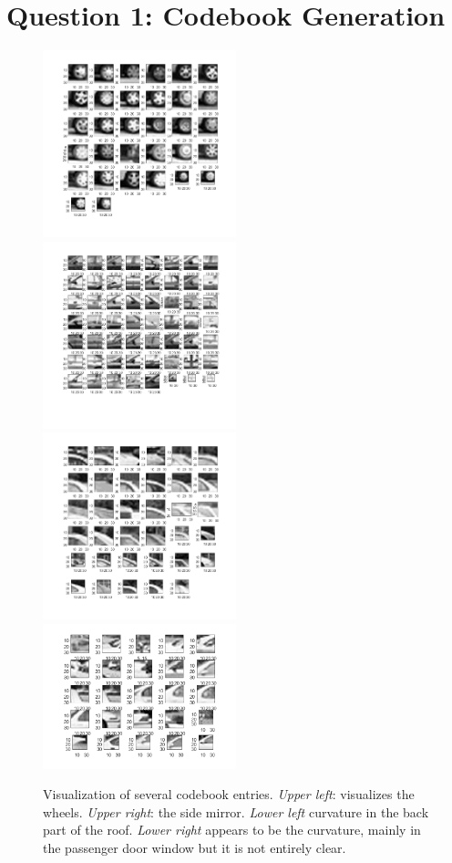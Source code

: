 \documentclass[12pt]{article}
\begin{document}
\section*{Question 1: Codebook Generation}
\begin{figure}[H]
	\includegraphics[width=0.5\textwidth]{features1}
	\includegraphics[width=0.5\textwidth]{features2}
	\includegraphics[width=0.5\textwidth]{features3}
	\includegraphics[width=0.5\textwidth]{features4}
		
	\caption{Visualization of several codebook entries. \textit{Upper left}: visualizes the wheels. \textit{Upper right}: the side mirror. \textit{Lower left} curvature in the back part of the roof. \textit{Lower right} appears to be the curvature, mainly in the passenger door window but it is not entirely clear.  }
\end{figure}
\end{document}

